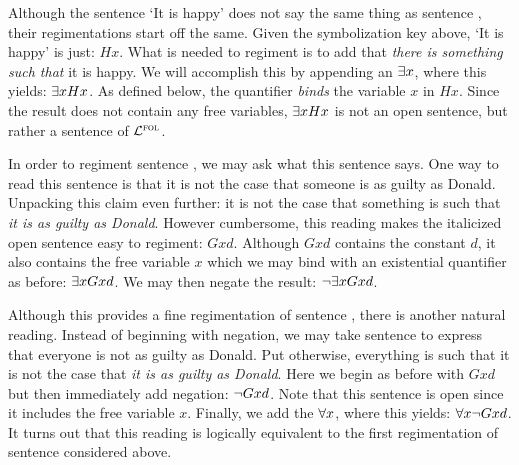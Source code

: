 Although the sentence `It is happy' does not say the same thing as sentence , their regimentations start off the same.
Given the symbolization key above, `It is happy' is just: $Hx$.
What is needed to regiment  is to add that \textit{there is something such that} it is happy.
We will accomplish this by appending an  $\exists x$, where this yields: $\exists x Hx$.
As defined below, the quantifier \textit{binds} the variable $x$ in $Hx$.
Since the result does not contain any free variables, $\exists x Hx$ is not an open sentence, but rather a sentence of $\mathcal{L}^{\textsc{fol}}$. 

In order to regiment sentence , we may ask what this sentence says.
One way to read this sentence is that it is not the case that someone is as guilty as Donald.
Unpacking this claim even further: it is not the case that something is such that \textit{it is as guilty as Donald}.
However cumbersome, this reading makes the italicized open sentence easy to regiment: $Gxd$.
Although $Gxd$ contains the constant $d$, it also contains the free variable $x$ which we may bind with an existential quantifier as before: $\exists x Gxd$.
We may then negate the result: $\neg \exists x Gxd$.

Although this provides a fine regimentation of sentence , there is another natural reading.
Instead of beginning with negation, we may take sentence  to express that everyone is not as guilty as Donald.
Put otherwise, everything is such that it is not the case that \textit{it is as guilty as Donald}.
Here we begin as before with $Gxd$ but then immediately add negation: $\neg Gxd$.
Note that this sentence is open since it includes the free variable $x$. 
Finally, we add the  $\forall x$, where this yields: $\forall x \neg Gxd$.
It turns out that this reading is logically equivalent to the first regimentation of sentence  considered above.

